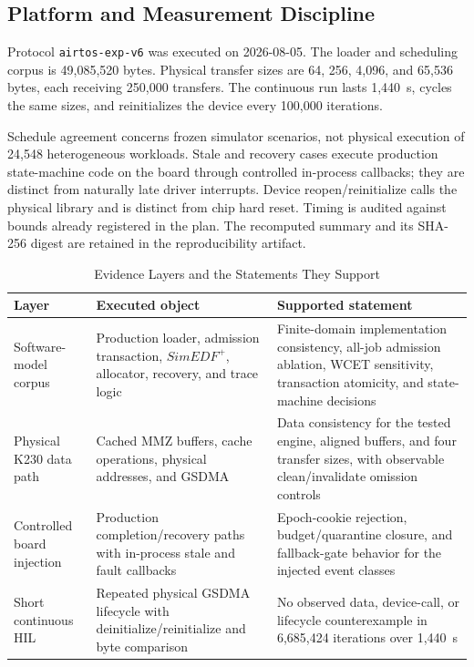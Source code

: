 \documentclass[lettersize,journal]{IEEEtran}
\begin{document}
\subsection{Platform and Measurement Discipline}
Protocol \texttt{airtos-exp-v6} was executed on 2026-08-05. The loader and
scheduling corpus is 49,085,520 bytes. Physical transfer sizes are 64, 256,
4,096, and 65,536 bytes, each receiving 250,000 transfers. The continuous run
lasts 1,440~s, cycles the same sizes, and reinitializes the device every 100,000
iterations.

Schedule agreement concerns frozen simulator scenarios, not physical execution
of 24,548 heterogeneous workloads. Stale and recovery cases execute production
state-machine code on the board through controlled in-process callbacks; they
are distinct from naturally late driver interrupts. Device reopen/reinitialize
calls the physical library and is distinct from chip hard reset. Timing is
audited against bounds already registered in the plan. The recomputed summary
and its SHA-256 digest are retained in the reproducibility artifact.

\begin{table}[t]
\caption{Evidence Layers and the Statements They Support}
\label{tab:layers}
\centering
\footnotesize
\begin{tabular}{@{}p{}p{}p{}@{}}
\toprule
Layer & Executed object & Supported statement \\
\midrule
Software-model corpus & Production loader, admission transaction, $SimEDF^+$, allocator, recovery, and trace logic & Finite-domain implementation consistency, all-job admission ablation, WCET sensitivity, transaction atomicity, and state-machine decisions \\
Physical K230 data path & Cached MMZ buffers, cache operations, physical addresses, and GSDMA & Data consistency for the tested engine, aligned buffers, and four transfer sizes, with observable clean/invalidate omission controls \\
Controlled board injection & Production completion/recovery paths with in-process stale and fault callbacks & Epoch-cookie rejection, budget/quarantine closure, and fallback-gate behavior for the injected event classes \\
Short continuous HIL & Repeated physical GSDMA lifecycle with deinitialize/reinitialize and byte comparison & No observed data, device-call, or lifecycle counterexample in 6,685,424 iterations over 1,440~s \\
\bottomrule
\end{tabular}
\end{table}
\end{document}

